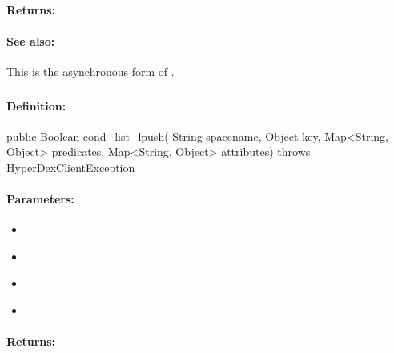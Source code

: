 \paragraph{Returns:}


\paragraph{See also:}  This is the asynchronous form of .

\pagebreak
\subsubsection{}
\label{api:java:cond_list_lpush}


\paragraph{Definition:}
\begin{javacode}
public Boolean cond_list_lpush(
        String spacename,
        Object key,
        Map<String, Object> predicates,
        Map<String, Object> attributes) throws HyperDexClientException
\end{javacode}

\paragraph{Parameters:}
\begin{itemize}[noitemsep]
\item {}\\

\item {}\\

\item {}\\

\item {}\\

\end{itemize}

\paragraph{Returns:}


